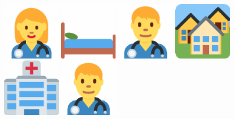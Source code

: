 \documentclass{beamer}
\begin{document}
\begin{frame}
\begin{center}
\includegraphics[width=0.22\textwidth]{doctorf}\hspace{3mm}
\includegraphics[width=0.22\textwidth]{bed}\hspace{3mm}
\includegraphics[width=0.22\textwidth]{doctorm}\hspace{3mm}
\includegraphics[width=0.22\textwidth]{homes}\\
\vspace{7mm}
\includegraphics[width=0.22\textwidth]{hospital}\hspace{3mm}
\includegraphics[width=0.22\textwidth]{doctorm}\hspace{3mm}

\end{center}
\end{frame}
\end{document}
